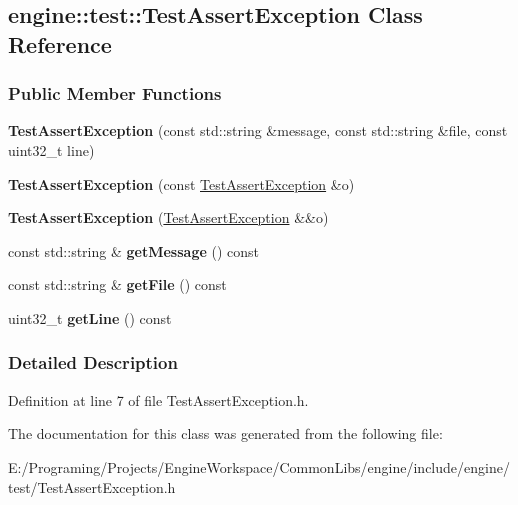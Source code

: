 \hypertarget{a00074}{}\subsection{engine\+:\+:test\+:\+:Test\+Assert\+Exception Class Reference}
\label{a00074}
\subsubsection*{Public Member Functions}
\begin{DoxyCompactItemize}
\item 
{\bfseries Test\+Assert\+Exception} (const std\+::string \&message, const std\+::string \&file, const uint32\+\_\+t line)\hypertarget{a00074_ac9c239ab8d911822d370f02fac37dd29}{}\label{a00074_ac9c239ab8d911822d370f02fac37dd29}

\item 
{\bfseries Test\+Assert\+Exception} (const \hyperlink{a00074}{Test\+Assert\+Exception} \&o)\hypertarget{a00074_aff4e8679403407322c5210ecb4c8e3b7}{}\label{a00074_aff4e8679403407322c5210ecb4c8e3b7}

\item 
{\bfseries Test\+Assert\+Exception} (\hyperlink{a00074}{Test\+Assert\+Exception} \&\&o)\hypertarget{a00074_a562ebcb87040546b0c93bd1cfa6ba528}{}\label{a00074_a562ebcb87040546b0c93bd1cfa6ba528}

\item 
const std\+::string \& {\bfseries get\+Message} () const \hypertarget{a00074_af4100e77a2e6124bba8407ad4b8c3c51}{}\label{a00074_af4100e77a2e6124bba8407ad4b8c3c51}

\item 
const std\+::string \& {\bfseries get\+File} () const \hypertarget{a00074_a7f2bbb8e2f61c3f640a76c54f48b2fc6}{}\label{a00074_a7f2bbb8e2f61c3f640a76c54f48b2fc6}

\item 
uint32\+\_\+t {\bfseries get\+Line} () const \hypertarget{a00074_adb1093ef55559e6d444325761e6b4a80}{}\label{a00074_adb1093ef55559e6d444325761e6b4a80}

\end{DoxyCompactItemize}


\subsubsection{Detailed Description}


Definition at line 7 of file Test\+Assert\+Exception.\+h.



The documentation for this class was generated from the following file\+:\begin{DoxyCompactItemize}
\item 
E\+:/\+Programing/\+Projects/\+Engine\+Workspace/\+Common\+Libs/engine/include/engine/test/Test\+Assert\+Exception.\+h\end{DoxyCompactItemize}
